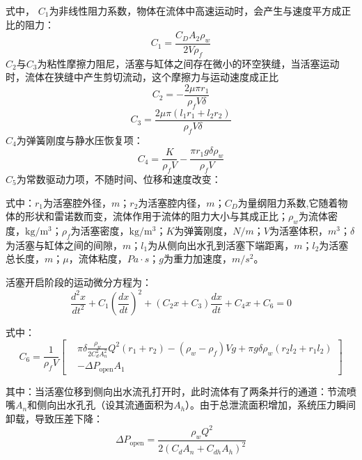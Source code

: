 式中， $C_1$为非线性阻力系数，物体在流体中高速运动时，会产生与速度平方成正比的阻力：
\begin{equation}
	C_1=\frac{C_DA_2\rho_w}{2V\rho_f}
\end{equation}
$C_2$与$C_3$为粘性摩擦力阻尼，活塞与缸体之间存在微小的环空狭缝，当活塞运动时，流体在狭缝中产生剪切流动，这个摩擦力与运动速度成正比
\begin{equation}
	C_2=-\frac{2\mu\pi r_1}{\rho_f V\delta}
\end{equation}
\begin{equation}
	C_3=\frac{2\mu\pi\left(l_1r_1+l_2r_2\right)}{\rho_f V \delta}
\end{equation}
$C_4$为弹簧刚度与静水压恢复项：
\begin{equation}
	C_4=\frac{K}{\rho_f V}-\frac{\pi r_1 g \delta \rho_w}{\rho_f V}
\end{equation}
 $C_5$为常数驱动力项，不随时间、位移和速度改变：
 
 式中：$r_1$为活塞腔外径，$m$；$r_2$为活塞腔内径，$m$；$C_D$为量纲阻力系数,它随着物体的形状和雷诺数而变，流体作用于流体的阻力大小与其成正比；$\rho_w$为流体密度，$\mathrm{kg/m^3}$；$\rho_f$为活塞密度，$\mathrm{kg/m^3}$；$K$为弹簧刚度，$N/m$；$V$为活塞体积，$m^3$；$\delta$为活塞与缸体之间的间隙，$m$；$l_1$为从侧向出水孔到活塞下端距离，$m$；$l_2$为活塞总长度，$m$；$\mu $，流体粘度，$Pa\cdot s$；$g$为重力加速度，$m/s^2$。
 
 活塞开启阶段的运动微分方程为：
 \begin{equation}
\frac{d^2 x}{dt^2}+C_1\left(\frac{dx}{dt}\right)^2 +(C_2 x+C_3)\frac{dx}{dt}+C_4 x +C_6=0
\end{equation}

 式中：
 \begin{equation}\label{eq:C6}
C_6=\frac{1}{\rho_f V}
\left[
\begin{aligned}
&\pi\delta \frac{\rho_w}{2C_d^2 A_n^2}Q^2(r_1+r_2)-(\rho_w-\rho_f)Vg+\pi g\delta\rho_w(r_2 l_2 + r_1 l_2)\\
&-\Delta P_{\mathrm{open}} A_1
\end{aligned}
\right]
\end{equation}

 
 其中：当活塞位移到侧向出水流孔打开时，此时流体有了两条并行的通道：节流喷嘴$A_n$和侧向出水孔孔（设其流通面积为$A_h$）。由于总泄流面积增加，系统压力瞬间卸载，导致压差下降：
 \begin{equation}\label{eq:deltaP_open}
\Delta P_{\mathrm{open}}=\frac{\rho_w Q^2}{2\left(C_d A_n + C_{dh} A_h\right)^2}
\end{equation}

